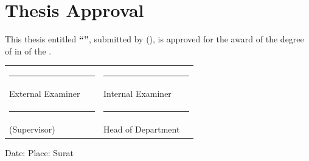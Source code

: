 \chapter*{Thesis Approval}

This thesis entitled \textbf{``\thesistitleplain''}, submitted by
\textbf{\authorname} (\rollno), is approved for the award of the degree of
\textbf{\degree} in \branch{} of the \institute.

\vspace{2cm}
\noindent
\begin{tabular}{@{}p{0.45\linewidth}p{0.45\linewidth}@{}}
\rule{0.8\linewidth}{0.4pt} & \rule{0.8\linewidth}{0.4pt} \\
External Examiner & Internal Examiner \\[2.5cm]
\rule{0.8\linewidth}{0.4pt} & \rule{0.8\linewidth}{0.4pt} \\
\supervisor{} (Supervisor) & Head of Department \\
\end{tabular}

\vspace{1.5cm}
\noindent Date: \hfill Place: Surat
